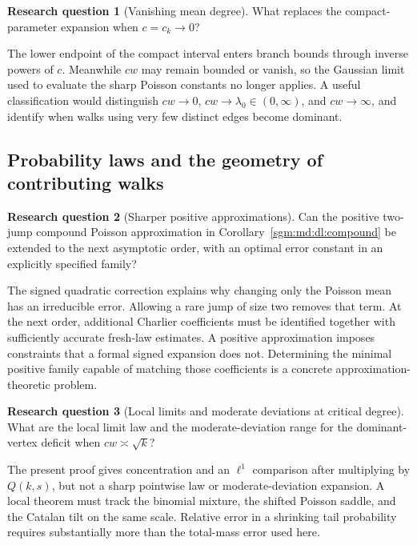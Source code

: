 \documentclass[11pt,letterpaper]{article}
\theoremstyle{remark}\newtheorem{remark}[theorem]{Remark}
\theoremstyle{definition}\newtheorem{definition}[theorem]{Definition}
\newtheorem{question}{Research question}[section]\theoremstyle{plain}
\begin{document}
\begin{question}[Vanishing mean degree]\label{sgm:md:q:vanishing}
What replaces the compact-parameter expansion when $c=c_k\to0$?
\end{question}
The lower endpoint of the compact interval enters branch bounds
through inverse powers of $c$. Meanwhile $cw$ may remain bounded or
vanish, so the Gaussian limit used to evaluate the sharp Poisson
constants no longer applies. A useful classification would distinguish
$cw\to0$, $cw\to\lambda_0\in(0,\infty)$, and $cw\to\infty$,
and identify when walks using very few distinct edges become dominant.

\subsection{Probability laws and the geometry of contributing walks}

\begin{question}[Sharper positive approximations]\label{sgm:md:q:positive}
Can the positive two-jump compound Poisson approximation in
Corollary~\ref{sgm:md:dl:compound} be extended to the next asymptotic order,
with an optimal error constant in an explicitly specified family?
\end{question}
The signed quadratic correction explains why changing only the
Poisson mean has an irreducible error. Allowing a rare jump of size
two removes that term. At the next order, additional Charlier
coefficients must be identified together with sufficiently accurate
fresh-law estimates. A positive approximation imposes constraints
that a formal signed expansion does not. Determining the minimal
positive family capable of matching those coefficients is a
concrete approximation-theoretic problem.

\begin{question}[Local limits and moderate deviations at critical degree]\label{sgm:md:q:local}
What are the local limit law and the moderate-deviation range for
the dominant-vertex deficit when $cw\asymp\sqrt{k}$?
\end{question}
The present proof gives concentration and an $\ell^1$ comparison
after multiplying by $Q(k,s)$, but not a sharp pointwise law or
moderate-deviation expansion. A local theorem must track the
binomial mixture, the shifted Poisson saddle, and the Catalan tilt
on the same scale. Relative error in a shrinking tail probability
requires substantially more than the total-mass error used here.
\end{document}
